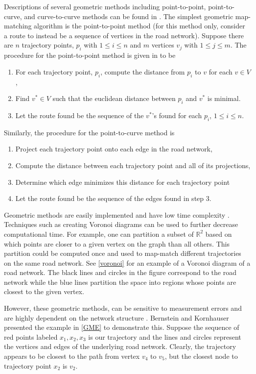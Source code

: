 \documentclass{article}
\numberwithin{equation}{section}
\theoremstyle{definition}
\begin{document}
Descriptions of several geometric methods including point-to-point, point-to-curve, and curve-to-curve methods can be found in \cite{BK}. The simplest geometric map-matching algorithm is the point-to-point method (for this method only, consider a route to instead be a sequence of vertices in the road network). Suppose there are $n$ trajectory points, $p_{i}$ with $1\leq i\leq n$ and $m$ vertices $v_{j}$ with $1\leq j\leq m$. The procedure for the point-to-point method is given in \cite{BK} to be
\begin{enumerate}
\item For each trajectory point, $p_i$, compute the distance from $p_i$ to $v$ for each $v\in V$,
\item Find $v^*\in V$ such that the euclidean distance between $p_i$ and $v^*$ is minimal.
\item Let the route found be the sequence of the $v^*$'s found for each $p_i$, $1\leq i\leq n$.
\end{enumerate}

\noindent Similarly, the procedure for the point-to-curve method is 
\begin{enumerate}
\item Project each trajectory point onto each edge in the road network,
\item Compute the distance between each trajectory point and all of its projections,
\item Determine which edge minimizes this distance for each trajectory point
\item Let the route found be the sequence of the edges found in step 3.
\end{enumerate}

Geometric methods are easily implemented and have low time complexity \cite{BK}. Techniques such as creating Voronoi diagrams can be used to further decrease computational time. For example, one can partition a subset of $\mathbb{R}^{2}$ based on which points are closer to a given vertex on the graph than all others. This partition could be computed once and used to map-match different trajectories on the same road network. See \autoref{voronoi} for an example of a Voronoi diagram of a road network. The black lines and circles in the figure correspond to the road network while the blue lines partition the space into regions whose points are closest to the given vertex.


However, these geometric methods, can be sensitive to measurement errors and are highly dependent on the network structure \cite{BK}. Bernstein and Kornhauser presented the example in \autoref{GME} to demonstrate this. Suppose the sequence of red points labeled $x_1,x_2,x_3$ is our trajectory and the lines and circles represent the vertices and edges of the underlying road network. Clearly, the trajectory appears to be closest to the path from vertex $v_4$ to $v_5$, but the closest node to trajectory point $x_2$ is $v_2$.
\end{document}

